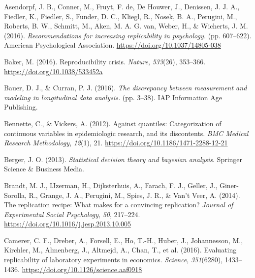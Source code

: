 \documentclass[
]{interact}
\newlength{\cslhangindent}
\newlength{\cslentryspacingunit} %
\newenvironment{CSLReferences}[2] %
 {%
  \setlength{\parindent}{0pt}
  \ifodd #1
  \let\oldpar\par
  \def\par{\hangindent=\cslhangindent\oldpar}
  \fi
  \setlength{\parskip}{#2\cslentryspacingunit}
 }%
 {}
\begin{document}
\small

\hypertarget{refs}{}
\begin{CSLReferences}{1}{0}
\leavevmode{}%
Asendorpf, J. B., Conner, M., Fruyt, F. de, De Houwer, J., Denissen, J.
J. A., Fiedler, K., Fiedler, S., Funder, D. C., Kliegl, R., Nosek, B.
A., Perugini, M., Roberts, B. W., Schmitt, M., Aken, M. A. G. van,
Weber, H., \& Wicherts, J. M. (2016). \emph{Recommendations for
increasing replicability in psychology.} (pp. 607--622). American
Psychological Association. \url{https://doi.org/10.1037/14805-038}

\leavevmode{}%
Baker, M. (2016). Reproducibility crisis. \emph{Nature}, \emph{533}(26),
353--366. \url{https://doi.org/10.1038/533452a}

\leavevmode{}%
Bauer, D. J., \& Curran, P. J. (2016). \emph{The discrepancy between
measurement and modeling in longitudinal data analysis.} (pp. 3--38).
IAP Information Age Publishing.

\leavevmode{}%
Bennette, C., \& Vickers, A. (2012). Against quantiles: Categorization
of continuous variables in epidemiologic research, and its discontents.
\emph{BMC Medical Research Methodology}, \emph{12}(1), 21.
\url{https://doi.org/10.1186/1471-2288-12-21}

\leavevmode{}%
Berger, J. O. (2013). \emph{Statistical decision theory and bayesian
analysis}. Springer Science \& Business Media.

\leavevmode{}%
Brandt, M. J., IJzerman, H., Dijksterhuis, A., Farach, F. J., Geller,
J., Giner-Sorolla, R., Grange, J. A., Perugini, M., Spies, J. R., \&
Van't Veer, A. (2014). The replication recipe: What makes for a
convincing replication? \emph{Journal of Experimental Social
Psychology}, \emph{50}, 217--224.
\url{https://doi.org/10.1016/j.jesp.2013.10.005}

\leavevmode{}%
Camerer, C. F., Dreber, A., Forsell, E., Ho, T.-H., Huber, J.,
Johannesson, M., Kirchler, M., Almenberg, J., Altmejd, A., Chan, T., et
al. (2016). Evaluating replicability of laboratory experiments in
economics. \emph{Science}, \emph{351}(6280), 1433--1436.
\url{https://doi.org/10.1126/science.aaf0918}


\end{CSLReferences}
\end{document}
